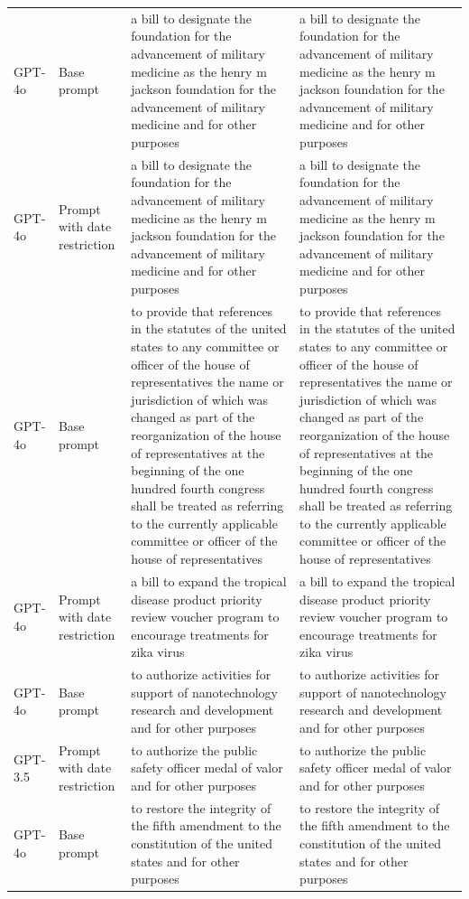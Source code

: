 \begin{longtable}{>{\raggedright\arraybackslash}p{1.4cm}>{\raggedright\arraybackslash}p{1.4cm}>{\raggedright\arraybackslash}p{5.5cm}>{\raggedright\arraybackslash}p{5.5cm}}
GPT-4o & Base prompt & a bill to designate the foundation for the advancement of military medicine as the henry m jackson foundation for the advancement of military medicine and for other purposes & a bill to designate the foundation for the advancement of military medicine as the henry m jackson foundation for the advancement of military medicine and for other purposes\\
GPT-4o & Prompt with date restriction & a bill to designate the foundation for the advancement of military medicine as the henry m jackson foundation for the advancement of military medicine and for other purposes & a bill to designate the foundation for the advancement of military medicine as the henry m jackson foundation for the advancement of military medicine and for other purposes\\
GPT-4o & Base prompt & to provide that references in the statutes of the united states to any committee or officer of the house of representatives the name or jurisdiction of which was changed as part of the reorganization of the house of representatives at the beginning of the one hundred fourth congress shall be treated as referring to the currently applicable committee or officer of the house of representatives & to provide that references in the statutes of the united states to any committee or officer of the house of representatives the name or jurisdiction of which was changed as part of the reorganization of the house of representatives at the beginning of the one hundred fourth congress shall be treated as referring to the currently applicable committee or officer of the house of representatives\\
GPT-4o & Prompt with date restriction & a bill to expand the tropical disease product priority review voucher program to encourage treatments for zika virus & a bill to expand the tropical disease product priority review voucher program to encourage treatments for zika virus\\
GPT-4o & Base prompt & to authorize activities for support of nanotechnology research and development and for other purposes & to authorize activities for support of nanotechnology research and development and for other purposes\\
GPT-3.5 & Prompt with date restriction & to authorize the public safety officer medal of valor and for other purposes & to authorize the public safety officer medal of valor and for other purposes\\
GPT-4o & Base prompt & to restore the integrity of the fifth amendment to the constitution of the united states and for other purposes & to restore the integrity of the fifth amendment to the constitution of the united states and for other purposes\\

\end{longtable}
